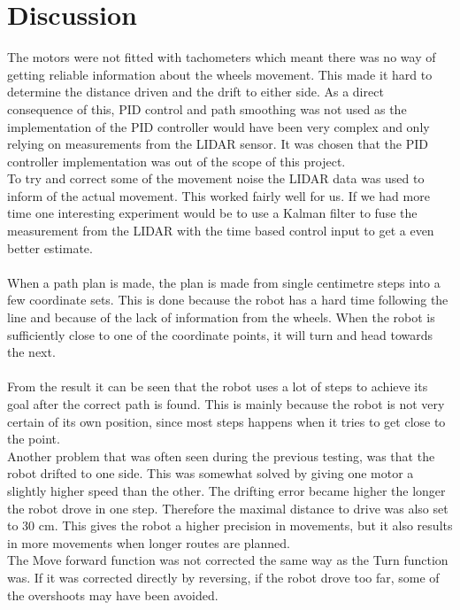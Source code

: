 \chapter{Discussion}

The motors were not fitted with tachometers which meant there was no way of getting reliable information about the wheels movement. This made it hard to determine the distance driven and the drift to either side. As a direct consequence of this, PID control and path smoothing was not used as the implementation of the PID controller would have been very complex and only relying on measurements from the LIDAR sensor. It was chosen that the PID controller implementation was out of the scope of this project. \\
To try and correct some of the movement noise the LIDAR data was used to inform of the actual movement. This worked fairly well for us. If we had more time one interesting experiment would be to use a Kalman filter to fuse the measurement from the LIDAR with the time based control input to get a even better estimate. \\\\
When a path plan is made, the plan is made from single centimetre steps into a  few coordinate sets. This is done because the robot has a hard time following the line and because of the lack of information from the wheels. When the robot is sufficiently close to one of the coordinate points, it will turn and head towards the next.\\\\
From the result it can be seen that the robot uses a lot of steps to achieve its goal after the correct path is found. This is mainly because the robot is not very certain of its own position, since most steps happens when it tries to get close to the point.\\
Another problem that was often seen during the previous testing, was that the robot drifted to one side. This was somewhat solved by giving one motor a slightly higher speed than the other. The drifting error became higher the longer the robot drove in one step. Therefore the maximal distance to drive was also set to 30 cm. This gives the robot a higher precision in movements, but it also results in more movements when longer routes are planned.\\
The Move forward function was not corrected the same way as the Turn function was. If it was corrected directly by reversing, if the robot drove too far, some of the overshoots may have been avoided.\\\\
